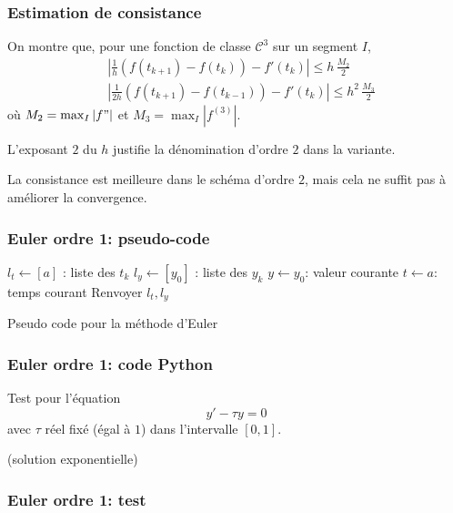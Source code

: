 \begin{frame}
  \frametitle{Estimation de consistance}
On montre que, pour une fonction de classe $\mathcal{C}^3$ sur un segment $I$,
\begin{align*}
  &\left|\frac{1}{h}\left( f(t_{k+1})-f(t_k)\right) -f'(t_k) \right|\leq h\,\frac{M_2}{2} \\
  &\left|\frac{1}{2h}\left( f(t_{k+1})-f(t_{k-1})\right) -f'(t_k) \right|\leq h^2\,\frac{M_3}{2}
\end{align*}
où $M_2 = \max_{I}|f"|$ et $M_3 = \max_{I}|f^{(3)}|$.

L'exposant $2$ du $h$ justifie la dénomination d'ordre $2$ dans la variante.

La consistance est meilleure dans le schéma d'ordre $2$, mais cela ne suffit pas à améliorer la convergence.
\end{frame}

\begin{frame}
  \frametitle{Euler ordre 1: pseudo-code}
\begin{algorithm}[H]
  $l_t\leftarrow [a]$ : liste des $t_k$\;
  $l_y\leftarrow [y_0]$ : liste des $y_k$\;
  $y\leftarrow y_0$: valeur courante \;
  $t\leftarrow a$: temps courant \;
  Renvoyer $l_t , l_y$\;
  \caption{Pseudo code pour la méthode d'Euler}
  \label{resolnumeqdiff_1}
\end{algorithm}
\end{frame}

\begin{frame}
  \frametitle{Euler ordre 1: code Python}

\end{frame}

\begin{frame}
Test pour l'équation
\begin{equation}
  y' - \tau y =0
  \label{eqtau}
\end{equation}
avec $\tau$ réel fixé (égal à $1$) dans l'intervalle $[0,1]$.

(solution exponentielle)
  \frametitle{Euler ordre 1: test}

\end{frame}

